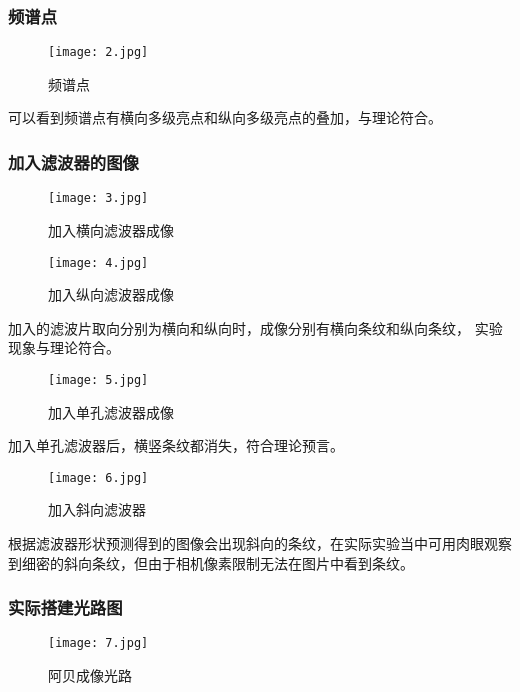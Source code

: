 \documentclass[12pt,a4paper]{article}
\begin{document}
        \subsubsection{频谱点}
            \begin{figure}[H]
                \centering
                \texttt{[image: 2.jpg]}
                \caption{频谱点}
            \end{figure}

        可以看到频谱点有横向多级亮点和纵向多级亮点的叠加，与理论符合。
        
        \subsubsection{加入滤波器的图像}
            \begin{figure}[H]
                \centering
                \texttt{[image: 3.jpg]}
                \caption{加入横向滤波器成像}
            \end{figure}
            \begin{figure}[H]
                \centering
                \texttt{[image: 4.jpg]}
                \caption{加入纵向滤波器成像}
            \end{figure}

        加入的滤波片取向分别为横向和纵向时，成像分别有横向条纹和纵向条纹，
        实验现象与理论符合。

            \begin{figure}[H]
                \centering
                \texttt{[image: 5.jpg]}
                \caption{加入单孔滤波器成像}
            \end{figure}

            加入单孔滤波器后，横竖条纹都消失，符合理论预言。

           
            \begin{figure}[H]
                \centering
                \texttt{[image: 6.jpg]}
                \caption{加入斜向滤波器}
            \end{figure}

        根据滤波器形状预测得到的图像会出现斜向的条纹，在实际实验当中可用肉眼观察到细密的斜向条纹，但由于相机像素限制无法在图片中看到条纹。

        \subsubsection{实际搭建光路图}
            \begin{figure}[H]
                \centering
                \texttt{[image: 7.jpg]}
                \caption{阿贝成像光路}
            \end{figure}
\end{document}
